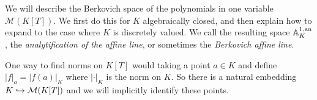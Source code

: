 We will describe the Berkovich space of the polynomials in one variable  $\mathcal{M} (K[T])$.
We first do this for $K$ algebraically closed, and then explain how to expand to the case where $K$ is discretely valued.
We call the resulting space $\mathbb{A}_K^{1, \text{an}}$, the \emph{analytification of the affine line}, or sometimes the \emph{Berkovich affine line}. 

\medskip

One way to find norms on $K[T]$ would taking a point $a \in K$ and define $|f|_a = |f(a)|_K$ where $|\cdot |_K$ is the norm on $K$. 
So there is a natural embedding $K \hookrightarrow \mathcal{M}(K[T])$ and we will implicitly identify these points.  

